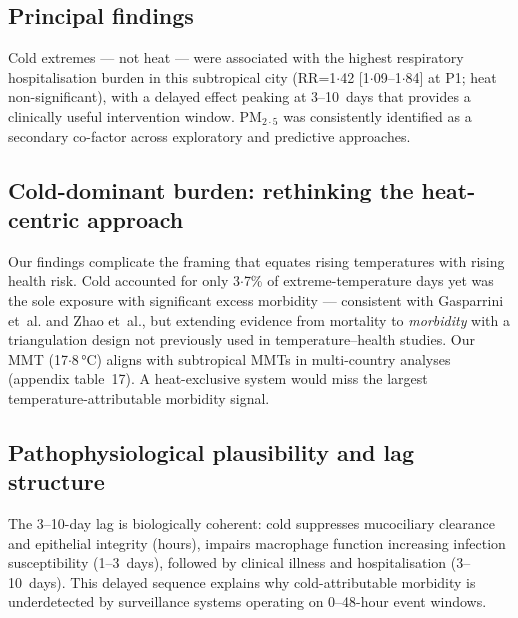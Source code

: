 \documentclass[review,number]{elsarticle}
\begin{document}
\subsection{Principal findings}

Cold extremes --- not heat --- were associated with the highest
respiratory hospitalisation burden in this subtropical city
(RR=1${\cdot}$42 [1${\cdot}$09--1${\cdot}$84] at P1; heat
non-significant), with a delayed effect peaking at 3--10~days that
provides a clinically useful intervention window. $\text{PM}_{2{\cdot}5}$
was consistently identified as a secondary co-factor across
exploratory and predictive approaches.

\subsection{Cold-dominant burden: rethinking the heat-centric approach}

Our findings complicate the framing that equates rising temperatures
with rising health risk.\cite{Bell2024,McMichael2006} Cold accounted
for only 3${\cdot}$7\% of extreme-temperature days yet was the sole
exposure with significant excess morbidity --- consistent with
Gasparrini et~al.\cite{Gasparrini2015} and Zhao
et~al.,\cite{Zhao2021} but extending evidence from mortality to
\emph{morbidity} with a triangulation design not previously used in
temperature--health studies. Our MMT (17${\cdot}$8\,°C) aligns with
subtropical MMTs in multi-country analyses\cite{Gasparrini2015}
(appendix table~17). A heat-exclusive system would miss the largest
temperature-attributable morbidity signal.\cite{PalmeiroSilva2025}

\subsection{Pathophysiological plausibility and lag structure}

The 3--10-day lag is biologically coherent: cold suppresses
mucociliary clearance and epithelial integrity (hours), impairs
macrophage function increasing infection susceptibility (1--3~days),
followed by clinical illness and hospitalisation
(3--10~days).\cite{Linares2025,Ebi2021} This delayed sequence
explains why cold-attributable morbidity is underdetected by
surveillance systems operating on 0--48-hour event windows.
\end{document}
